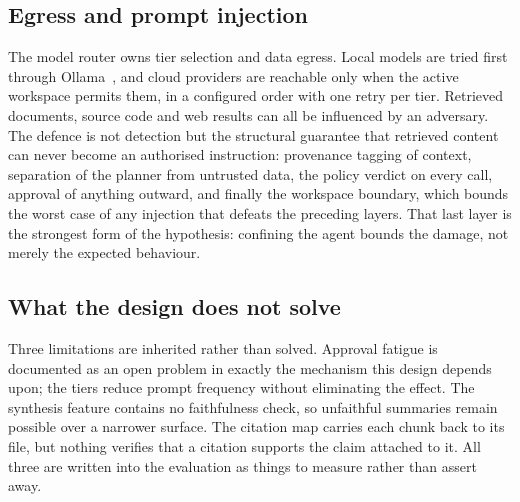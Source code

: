 \subsection{Egress and prompt injection}
The model router owns tier selection and data egress. Local models are tried first through Ollama~\cite{ollama2024}, and cloud providers are reachable only when the active workspace permits them, in a configured order with one retry per tier. Retrieved documents, source code and web results can all be influenced by an adversary. The defence is not detection but the structural guarantee that retrieved content can never become an authorised instruction: provenance tagging of context, separation of the planner from untrusted data, the policy verdict on every call, approval of anything outward, and finally the workspace boundary, which bounds the worst case of any injection that defeats the preceding layers. That last layer is the strongest form of the hypothesis: confining the agent bounds the damage, not merely the expected behaviour.

\subsection{What the design does not solve}
Three limitations are inherited rather than solved. Approval fatigue is documented as an open problem in exactly the mechanism this design depends upon; the tiers reduce prompt frequency without eliminating the effect. The synthesis feature contains no faithfulness check, so unfaithful summaries remain possible over a narrower surface. The citation map carries each chunk back to its file, but nothing verifies that a citation supports the claim attached to it. All three are written into the evaluation as things to measure rather than assert away.
